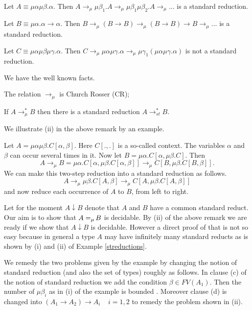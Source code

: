 \documentclass[11pt,aslarticle,xperspectives,bibay3]{asl}
\newcommand\redmu{\mathrel{\rightarrow_{\mu}}}
\newcommand\redmustar{\mathrel{\rightarrow^{\ast}_{\mu}}}
\newcommand\redst{\mathrel{\rightarrow^{\ast}_{st}}}
\begin{document}
{\begin{example}\label{streductions}
\bsub\fit Let $A \equiv\mu\alpha\mu\beta.\alpha.$ Then $A\redmu\mu\beta_1.A\redmu\mu\beta_1\mu\beta_2.A\redmu\ldots$ is a standard reduction.
\item Let $B\equiv\mu\alpha.\alpha\to\alpha.$ Then $B\redmu(B\to B)\redmu(B\to B)\to B\redmu\ldots$ is a standard reduction.
\item Let $C\equiv\mu\alpha\mu\beta\mu\gamma.\alpha.$ Then $C\redmu\mu\alpha\mu\gamma.\alpha\redmu\mu\gamma_1(\mu\alpha\mu\gamma.\alpha)$ is not a standard reduction. 
\esub
\end{example} 

\brem\label{facts} We have the well known facts.
\bsub \item The relation $\redmu$ is Church Rosser (CR);
\item If $A \redmustar B$ then there is a standard reduction $A\redst B.$
\esub
\erem

We illustrate (ii) in the above remark by an example.
\begin{example}\label{examplestreduction}
Let $A=\mu\alpha\mu\beta.C[\alpha,\beta].$ Here $C[.,.]$ is a so-called context. The variables $\alpha$ and $\beta$ can occur several times in it. Now let $B=\mu\alpha.C[\alpha,\mu\beta.C].$ Then
$$A\redmu B=\mu\alpha.C[\alpha,\mu\beta.C[\alpha,\beta]]\redmu C[B,\mu\beta.C[B,\beta]].$$
We can make this two-step reduction into a standard reduction as follows.
$$A\redmu\mu\beta.C[A,\beta]\redmu C[A,\mu\beta.C[A,\beta]]$$
and now reduce each occurrence of $A$ to $B$, from left to right.
\end{example}

Let for the moment $A\downarrow B$ denote that $A$ and $B$ have a common standard reduct. Our aim is to show that $A{\; =_{\mu} \,} B$ is decidable. By (ii) of the above remark we are ready if we show that $A\downarrow B$ is decidable. However a direct proof of that is not so easy because in general a type $A$ may have infinitely many standard reducts as is shown by (i) and (ii) of Example \ref{streductions}.

We remedy the two problems given by the example by changing the notion of standard reduction (and also the set of types)  roughly as follows. In clause (c) of the notion of standard reduction we add the condition $\beta\in FV(A_1).$ Then the number of $\mu\beta_i$ as in (i) of the  example  is bounded . Moreover clause (d) is changed into $(A_1\to A_2)\to A_i\;\;\;\;i = 1,2$ to remedy the problem shown in (ii).

}
\end{document}
